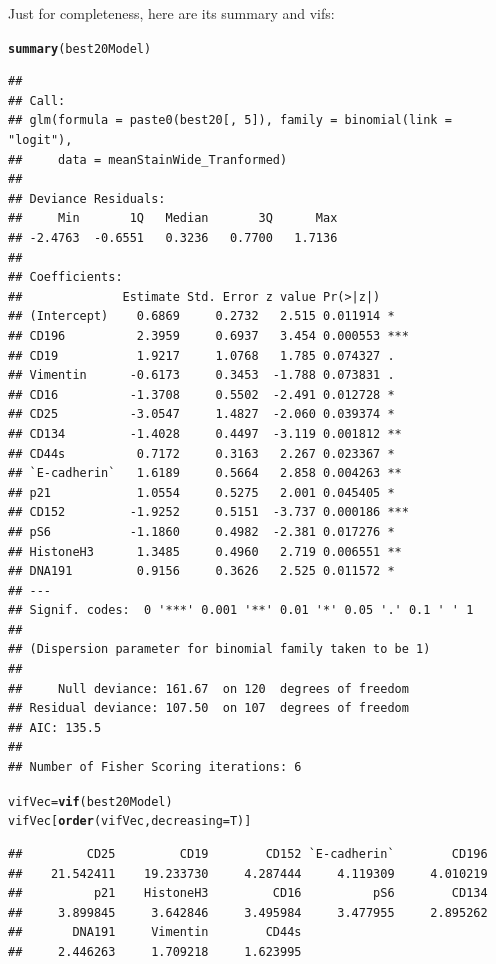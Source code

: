 \documentclass[a4paper]{article}\usepackage[]{graphicx}\usepackage[]{color}
\makeatletter
\newcommand{\hlstd}[1]{\textcolor[rgb]{0.345,0.345,0.345}{#1}}%
\newcommand{\hlkwb}[1]{\textcolor[rgb]{0.69,0.353,0.396}{#1}}%
\newcommand{\hlkwc}[1]{\textcolor[rgb]{0.333,0.667,0.333}{#1}}%
\newcommand{\hlkwd}[1]{\textcolor[rgb]{0.737,0.353,0.396}{\textbf{#1}}}%
\newenvironment{kframe}{%
 \def\at@end@of@kframe{}%
 \ifinner\ifhmode%
  \def\at@end@of@kframe{\end{minipage}}%
  \begin{minipage}{\columnwidth}%
 \fi\fi%
 \def\FrameCommand##1{\hskip\@totalleftmargin \hskip-\fboxsep
 \colorbox{shadecolor}{##1}\hskip-\fboxsep
     \hskip-\linewidth \hskip-\@totalleftmargin \hskip\columnwidth}%
 \MakeFramed {\advance\hsize-\width
   \@totalleftmargin\z@ \linewidth\hsize
   \@setminipage}}%
 {\par\unskip\endMakeFramed%
 \at@end@of@kframe}
\newenvironment{knitrout}{}{} %
\makeatother
\begin{document}
Just for completeness, here are its summary and vifs:
\begin{knitrout}
\color{fgcolor}\begin{kframe}
\begin{alltt}
\hlkwd{summary}\hlstd{(best20Model)}
\end{alltt}
\begin{verbatim}
## 
## Call:
## glm(formula = paste0(best20[, 5]), family = binomial(link = "logit"), 
##     data = meanStainWide_Tranformed)
## 
## Deviance Residuals: 
##     Min       1Q   Median       3Q      Max  
## -2.4763  -0.6551   0.3236   0.7700   1.7136  
## 
## Coefficients:
##              Estimate Std. Error z value Pr(>|z|)    
## (Intercept)    0.6869     0.2732   2.515 0.011914 *  
## CD196          2.3959     0.6937   3.454 0.000553 ***
## CD19           1.9217     1.0768   1.785 0.074327 .  
## Vimentin      -0.6173     0.3453  -1.788 0.073831 .  
## CD16          -1.3708     0.5502  -2.491 0.012728 *  
## CD25          -3.0547     1.4827  -2.060 0.039374 *  
## CD134         -1.4028     0.4497  -3.119 0.001812 ** 
## CD44s          0.7172     0.3163   2.267 0.023367 *  
## `E-cadherin`   1.6189     0.5664   2.858 0.004263 ** 
## p21            1.0554     0.5275   2.001 0.045405 *  
## CD152         -1.9252     0.5151  -3.737 0.000186 ***
## pS6           -1.1860     0.4982  -2.381 0.017276 *  
## HistoneH3      1.3485     0.4960   2.719 0.006551 ** 
## DNA191         0.9156     0.3626   2.525 0.011572 *  
## ---
## Signif. codes:  0 '***' 0.001 '**' 0.01 '*' 0.05 '.' 0.1 ' ' 1
## 
## (Dispersion parameter for binomial family taken to be 1)
## 
##     Null deviance: 161.67  on 120  degrees of freedom
## Residual deviance: 107.50  on 107  degrees of freedom
## AIC: 135.5
## 
## Number of Fisher Scoring iterations: 6
\end{verbatim}
\begin{alltt}
\hlstd{vifVec} \hlkwb{=} \hlkwd{vif}\hlstd{(best20Model)}
\hlstd{vifVec[}\hlkwd{order}\hlstd{(vifVec,}\hlkwc{decreasing}\hlstd{=T)]}
\end{alltt}
\begin{verbatim}
##         CD25         CD19        CD152 `E-cadherin`        CD196 
##    21.542411    19.233730     4.287444     4.119309     4.010219 
##          p21    HistoneH3         CD16          pS6        CD134 
##     3.899845     3.642846     3.495984     3.477955     2.895262 
##       DNA191     Vimentin        CD44s 
##     2.446263     1.709218     1.623995
\end{verbatim}
\end{kframe}
\end{knitrout}
\end{document}
